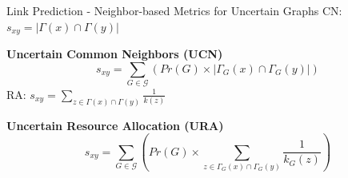 \documentclass[9pt]{beamer}
\begin{document}




\begin{frame}{Link Prediction - Neighbor-based Metrics for Uncertain Graphs}
CN: $s_{xy}=|\Gamma(x)\cap\Gamma(y)|$

\textbf{Uncertain Common Neighbors (UCN)}
\begin{equation}
s_{xy}=\sum_{G\in \mathcal{G}}( Pr(G)\times|\Gamma_G(x)\cap\Gamma_G(y)|)
\end{equation}
RA: $s_{xy}=\sum_{z\in \Gamma(x)\cap\Gamma(y)}\frac{1}{k(z)}$

\textbf{Uncertain Resource Allocation (URA)}
\begin{equation}
s_{xy}=\sum_{G\in \mathcal{G}}( Pr(G)\times\sum_{z\in \Gamma_G(x)\cap\Gamma_G(y)}\frac{1}{k_G(z)})
\end{equation}

\end{frame}
\end{document}
